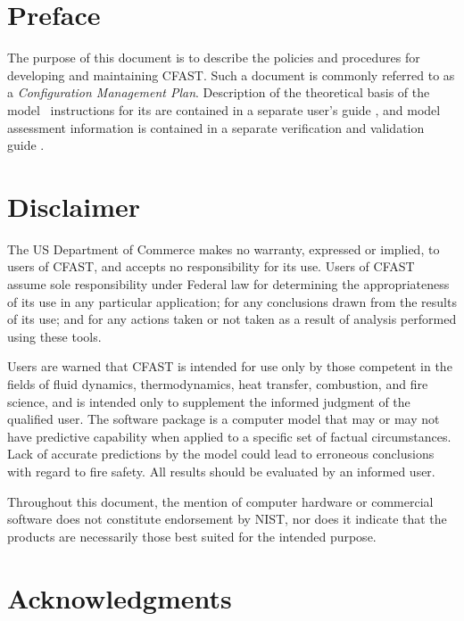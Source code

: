 \documentclass[12pt]{book}
\begin{document}
\newpage

\frontmatter

\pagestyle{plain}
\setcounter{page}{3}


\chapter{Preface}

The purpose of this document is to describe the policies and procedures for developing and maintaining CFAST. Such a document is commonly referred to as a {\em Configuration Management Plan}. Description of the theoretical basis of the model \cite{CFAST_Tech_Guide_7}\, instructions for its are contained in a separate user's guide \cite{CFAST_Users_Guide_7}, and model assessment information is contained in a separate verification and validation guide \cite{CFAST_Valid_Guide_7}.

\chapter{Disclaimer}

The US Department of Commerce makes no warranty, expressed or implied, to users of CFAST, and accepts no responsibility for its use. Users of CFAST assume sole responsibility under Federal law for determining the appropriateness of its use in any particular application; for any conclusions drawn from the results of its use; and for any actions taken or not taken as a result of analysis performed using these tools.

Users are warned that CFAST is intended for use only by those competent in the fields of fluid dynamics, thermodynamics, heat transfer, combustion, and fire science, and is intended only to supplement the informed judgment of the qualified user. The software package is a computer model that may or may not have predictive capability when applied to a specific set of factual circumstances. Lack of accurate predictions by the model could lead to erroneous conclusions with regard to fire safety. All results should be evaluated by an informed user.

Throughout this document, the mention of computer hardware or commercial software does not constitute endorsement by NIST, nor does it indicate that the products are necessarily those best suited for the intended purpose.




\chapter{Acknowledgments}
\end{document}
